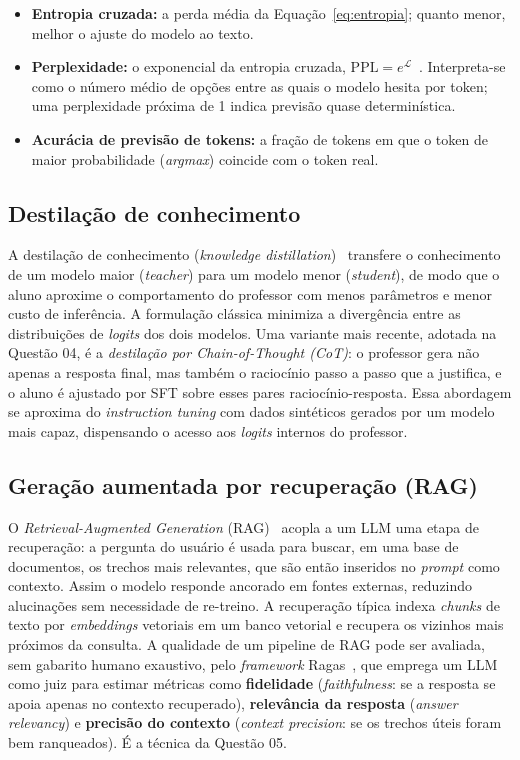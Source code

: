 \begin{itemize}[leftmargin=2.2em]
  \item \textbf{Entropia cruzada:} a perda média da Equação~\ref{eq:entropia};
        quanto menor, melhor o ajuste do modelo ao texto.
  \item \textbf{Perplexidade:} o exponencial da entropia cruzada,
        $\mathrm{PPL} = e^{\mathcal{L}}$~\cite{jelinek1977perplexity}. Interpreta-se
        como o número médio de opções entre as quais o modelo hesita por token; uma
        perplexidade próxima de 1 indica previsão quase determinística.
  \item \textbf{Acurácia de previsão de tokens:} a fração de tokens em que o token de
        maior probabilidade (\textit{argmax}) coincide com o token real.
\end{itemize}

\subsection{Destilação de conhecimento}
\label{sec:fund-destilacao}

A destilação de conhecimento (\textit{knowledge distillation})~\cite{hinton2015distilling}
transfere o conhecimento de um modelo maior (\textit{teacher}) para um modelo menor
(\textit{student}), de modo que o aluno aproxime o comportamento do professor com
menos parâmetros e menor custo de inferência. A formulação clássica minimiza a
divergência entre as distribuições de \textit{logits} dos dois modelos. Uma
variante mais recente, adotada na Questão 04, é a \emph{destilação por
Chain-of-Thought (CoT)}: o professor gera não apenas a resposta final, mas também o
raciocínio passo a passo que a justifica, e o aluno é ajustado por SFT sobre esses
pares raciocínio-resposta. Essa abordagem se aproxima do \textit{instruction tuning}
com dados sintéticos gerados por um modelo mais capaz, dispensando o acesso aos
\textit{logits} internos do professor.

\subsection{Geração aumentada por recuperação (RAG)}
\label{sec:fund-rag}

O \textit{Retrieval-Augmented Generation} (RAG)~\cite{lewis2020rag} acopla a um LLM
uma etapa de recuperação: a pergunta do usuário é usada para buscar, em uma base de
documentos, os trechos mais relevantes, que são então inseridos no \textit{prompt}
como contexto. Assim o modelo responde ancorado em fontes externas, reduzindo
alucinações sem necessidade de re-treino. A recuperação típica indexa \textit{chunks}
de texto por \textit{embeddings} vetoriais em um banco vetorial e recupera os
vizinhos mais próximos da consulta. A qualidade de um pipeline de RAG pode ser
avaliada, sem gabarito humano exaustivo, pelo \textit{framework}
Ragas~\cite{es2024ragas}, que emprega um LLM como juiz para estimar métricas como
\textbf{fidelidade} (\textit{faithfulness}: se a resposta se apoia apenas no contexto
recuperado), \textbf{relevância da resposta} (\textit{answer relevancy}) e
\textbf{precisão do contexto} (\textit{context precision}: se os trechos úteis foram
bem ranqueados). É a técnica da Questão 05.

